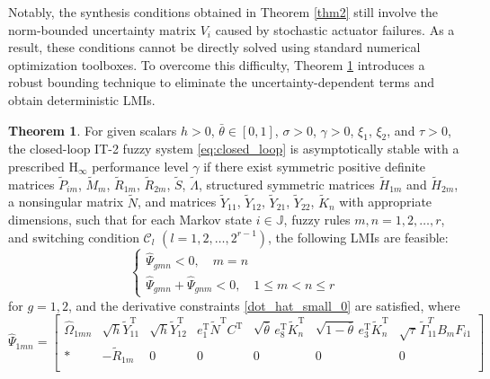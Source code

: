 \documentclass[preprint,review,fleqn,sort&compress,3p]{elsarticle}
\theoremstyle{definition} %
\theoremstyle{definition}%
\newtheorem{thm}{Theorem}[section]
\begin{document}
Notably, the synthesis conditions obtained in Theorem \ref{thm2} still involve the norm-bounded uncertainty matrix $V_i$ caused by stochastic actuator failures. As a result, these conditions cannot be directly solved using standard numerical optimization toolboxes. To overcome this difficulty, Theorem \ref{thm3} introduces a robust bounding technique to eliminate the uncertainty-dependent terms and obtain deterministic LMIs.
\begin{thm}\label{thm3}
	 For given scalars $h>0$, $\bar{\theta}\in[0,1]$, $\sigma>0$, $\gamma>0$, $\xi_1$, $\xi_2$, and $\tau>0$, the closed-loop IT-2 fuzzy system \eqref{eq:closed_loop} is asymptotically stable with a prescribed $\mathrm{H}_\infty$ performance level $\gamma$ if there exist symmetric positive definite matrices 
	$\widetilde{P}_{im}$, 
	$\widetilde{M}_{m}$, 
	$\widetilde{R}_{1m}$, 
	$\widetilde{R}_{2m}$,
	$\widetilde{S}$,
	$\widetilde{\Lambda}$,
	structured symmetric matrices
	$\widetilde{H}_{1m}$ and
	$\widetilde{H}_{2m}$,
	a nonsingular matrix $\widetilde{N}$, 
	and matrices 
	$\widetilde{Y}_{11}$,
	$\widetilde{Y}_{12}$,
	$\widetilde{Y}_{21}$,
	$\widetilde{Y}_{22}$,
	$\widetilde{K}_n$
	with appropriate dimensions, such that for each Markov state $i\in\mathbb{J}$, fuzzy rules $m,n=1,2,\ldots,r$, and switching condition $\mathcal{C}_l$ $(l=1,2,\ldots,2^{r-1})$, the following LMIs are feasible:
	\begin{equation}\label{shucr1_hat}
		\begin{cases}
			\widehat{\Psi}_{gmn} < 0,\quad m=n \\[1ex]
			\widehat{\Psi}_{gmn} + \widehat{\Psi}_{gnm} < 0,\quad 1 \le m < n \le r
		\end{cases}
	\end{equation}
	for $g=1,2$, and the derivative constraints \eqref{dot_hat_small_0} are satisfied, where
	\begin{equation}\label{LMI1_hat}
		\widehat{\Psi}_{1mn}=
		\begin{bmatrix}
			
			\widehat{\Omega}_{1mn}
			&
			\sqrt{h} \widetilde Y_{11}^{\mathrm{T}}
			&
			\sqrt{h} \widetilde Y_{12}^{\mathrm{T}}
			&
			e_1^{\mathrm{T}}\widetilde N^{\mathrm{T}}C^{\mathrm{T}}
			&
			\sqrt{\bar\theta}\,e_8^{\mathrm{T}}\widetilde K_n^{\mathrm{T}}
			&
			\sqrt{1-\bar\theta}\,e_3^{\mathrm{T}}\widetilde K_n^{\mathrm{T}}
			&
			\sqrt{\tau}\,
			\widetilde{\Gamma}_{11}^{T}
			B_mF_{i1}
			\\[1.5ex]
			
			*
			&
			-\widetilde R_{1m}
			&
			0
			&
			0
			&
			0
			&
			0
			&
			0
			\\[1.5ex]
			

\end{bmatrix}
\end{equation}
\end{thm}
\end{document}
